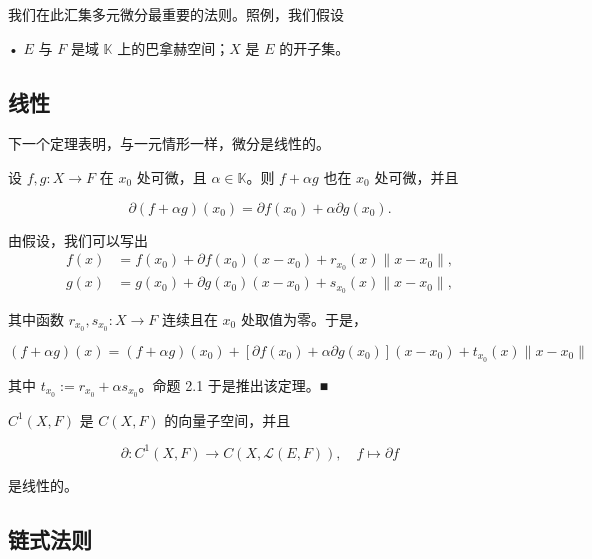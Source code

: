 我们在此汇集多元微分最重要的法则。照例，我们假设

• $ E $ 与 $ F $ 是域 $ \mathbb{K} $ 上的巴拿赫空间；$ X $ 是 $ E $ 的开子集。

\subsection*{线性}

下一个定理表明，与一元情形一样，微分是线性的。

\begin{proposition}

设 $ f, g : X \to F $ 在 $ x_0 $ 处可微，且 $ \alpha \in \mathbb{K} $。则 $ f + \alpha g $ 也在 $ x_0 $ 处可微，并且

\[
\partial(f + \alpha g)(x_0) = \partial f(x_0) + \alpha\partial g(x_0) .
\]

\proofhead
由假设，我们可以写出
\begin{equation*}
\begin{aligned}
f(x) &= f(x_0) + \partial f(x_0)(x - x_0) + r_{x_0}(x)\|x - x_0\| , \\ g(x) &= g(x_0) + \partial g(x_0)(x - x_0) + s_{x_0}(x)\|x - x_0\| ,
\end{aligned}
\end{equation*}

其中函数 $ r_{x_0}, s_{x_0} : X \to F $ 连续且在 $ x_0 $ 处取值为零。于是，

\[
(f + \alpha g)(x) = (f + \alpha g)(x_0) + [\partial f(x_0) + \alpha\partial g(x_0)](x - x_0) + t_{x_0}(x)\|x - x_0\|
\]

其中 $ t_{x_0} := r_{x_0} + \alpha s_{x_0} $。命题 2.1 于是推出该定理。\nobreak\hspace{0.35em}■

\end{proposition}

\begin{corollary}

$ C^1(X, F) $ 是 $ C(X, F) $ 的向量子空间，并且

\[
\partial : C^1(X, F) \to C(X, \mathcal{L}(E, F)) , \quad f \mapsto \partial f
\]

是线性的。

\end{corollary}

\subsection*{链式法则}

